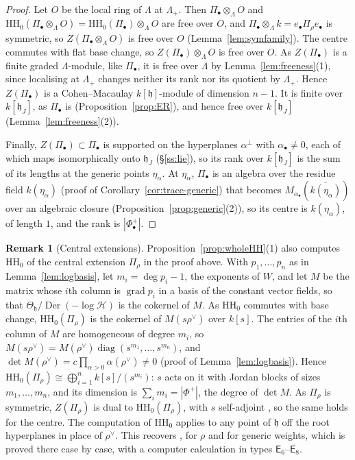 \documentclass[11pt]{amsart}
\numberwithin{table}{section}
\numberwithin{figure}{section}
\numberwithin{equation}{section}
\theoremstyle{definition}
\newtheorem{rem}[thm]{Remark}
\theoremstyle{plain}
\newcommand{\h}{\mathfrak{h}}
\newcommand{\bul}{\bullet}
\newcommand{\HH}{\mathrm{HH}}
\DeclareMathOperator{\Der}{Der}
\begin{document}
\begin{proof}
Let $O$ be the local ring of $\Lambda$ at $\Lambda_+$. Then $\Pi_\bul \otimes_\Lambda O$ and $\HH_0(\Pi_\bul \otimes_\Lambda O) = \HH_0(\Pi_\bul) \otimes_\Lambda O$ are free over $O$, and $\Pi_\bul \otimes_\Lambda k = e_\bul\Pi_\rho e_\bul$ is symmetric, so $Z(\Pi_\bul \otimes_\Lambda O)$ is free over $O$ (Lemma~\ref{lem:symfamily}). The centre commutes with flat base change, so $Z(\Pi_\bul) \otimes_\Lambda O$ is free over $O$. As $Z(\Pi_\bul)$ is a finite graded $\Lambda$-module, like $\Pi_\bul$, it is free over $\Lambda$ by Lemma~\ref{lem:freeness}(1), since localising at $\Lambda_+$ changes neither its rank nor its quotient by $\Lambda_+$. Hence $Z(\Pi_\bul)$ is a Cohen--Macaulay $k[\h]$-module of dimension $n - 1$. It is finite over $k[\h_J]$, as $\Pi_\bul$ is (Proposition~\ref{prop:ER}), and hence free over $k[\h_J]$ (Lemma~\ref{lem:freeness}(2)).

Finally, $Z(\Pi_\bul) \subset \Pi_\bul$ is supported on the hyperplanes $\alpha^\perp$ with $\alpha_\bul \neq 0$, each of which maps isomorphically onto $\h_J$ (\S\ref{ss:lie}), so its rank over $k[\h_J]$ is the sum of its lengths at the generic points $\eta_\alpha$. At $\eta_\alpha$, $\Pi_\bul$ is an algebra over the residue field $k(\eta_\alpha)$ (proof of Corollary~\ref{cor:trace-generic}) that becomes $M_{\alpha_\bul}(\overline{k(\eta_\alpha)})$ over an algebraic closure (Proposition~\ref{prop:generic}(2)), so its centre is $k(\eta_\alpha)$, of length $1$, and the rank is $|\Phi^+_\bul|$.
\end{proof}

\begin{rem}[Central extensions]\label{rem:ELR}
Proposition~\ref{prop:wholeHH}(1) also computes $\HH_0$ of the central extension $\Pi_\rho$ in the proof above. With $p_1, \dots, p_n$ as in Lemma~\ref{lem:logbasis}, let $m_i = \deg p_i - 1$, the exponents of $W$, and let $M$ be the matrix whose $i$th column is $\operatorname{grad} p_i$ in a basis of the constant vector fields, so that $\Theta_\h/\Der(-\log\mathcal H)$ is the cokernel of $M$. As $\HH_0$ commutes with base change, $\HH_0(\Pi_\rho)$ is the cokernel of $M(s\rho^\vee)$ over $k[s]$. The entries of the $i$th column of $M$ are homogeneous of degree $m_i$, so $M(s\rho^\vee) = M(\rho^\vee)\operatorname{diag}(s^{m_1}, \dots, s^{m_n})$, and $\det M(\rho^\vee) = c\prod_{\alpha>0}\alpha(\rho^\vee) \neq 0$ (proof of Lemma~\ref{lem:logbasis}). Hence $\HH_0(\Pi_\rho) \cong \bigoplus_{i=1}^n k[s]/(s^{m_i})$: $s$ acts on it with Jordan blocks of sizes $m_1, \dots, m_n$, and its dimension is $\sum_i m_i = |\Phi^+|$, the degree of $\det M$. As $\Pi_\rho$ is symmetric, $Z(\Pi_\rho)$ is dual to $\HH_0(\Pi_\rho)$, with $s$ self-adjoint \cite[Cor~2.2, \S2.3]{ELR}, so the same holds for the centre. The computation of $\HH_0$ applies to any point of $\h$ off the root hyperplanes in place of $\rho^\vee$. This recovers \cite[Thm~3.1]{ELR}, for $\rho$ and for generic weights, which is proved there case by case, with a computer calculation in types $\mathsf{E}_6$--$\mathsf{E}_8$.
\end{rem}
\end{document}
